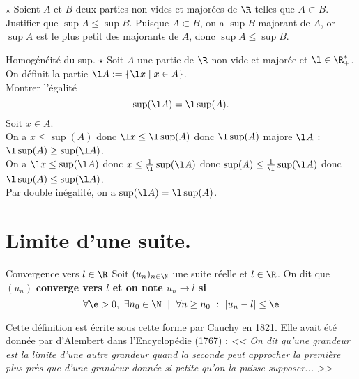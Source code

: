 \documentclass[11pt]{article}
\begin{document}
\begin{ex}{$\star$}{}
    Soient $A$ et $B$ deux parties non-vides et majorées de $\R$ telles que $A\subset B$.\\
    Justifier que $\sup A \leq \sup B$.
    \tcblower
    Puisque $A\subset B$, on a $\sup B$ majorant de $A$, or $\sup A$ est le plus petit des majorants de $A$, donc $\sup A \leq \sup B$. 
\end{ex}

\begin{ex}{Homogénéité du sup. $\star$}{}
    Soit $A$ une partie de $\R$ non vide et majorée et $\l\in\R_+^*$. On définit la partie $\l A := \{\l x \mid x \in A\}$.\\
    Montrer l'égalité
    \begin{equation*}
        \sup(\l A) = \l\sup(A).
    \end{equation*}
    \tcblower
    Soit $x\in A$.\\
    \boxed{\leq} On a $x\leq\sup(A)$ donc $\l x \leq \l \sup(A)$ donc $\l\sup(A)$ majore $\l A$ : $\l\sup(A)\geq\sup(\l A)$.\\[0.1cm]
    \boxed{\geq} On a $\l x \leq \sup(\l A)$ donc $x\leq \frac{1}{\l}\sup(\l A)$ donc $\sup(A)\leq \frac{1}{\l}\sup(\l A)$ donc $\l\sup(A)\leq\sup(\l A)$.\\[0.1cm]
    Par double inégalité, on a $\sup(\l A) = \l\sup(A)$. 
\end{ex}

\section{Limite d'une suite.}

\begin{defi}{Convergence vers $l\in\R$}{}
    Soit $(u_n)_{n\in\N}$ une suite réelle et $l\in\R$. On dit que $(u_n)$ \bf{converge} vers $l$ et on note $u_n\to l$ si
    \begin{equation*}
        \forall \e > 0, ~ \exists n_0 \in \N ~ \mid ~ \forall n \geq n_0 ~ : ~ |u_n - l| \leq \e
    \end{equation*}
\end{defi}

\quad Cette définition est écrite sous cette forme par Cauchy en 1821. Elle avait été donnée par d'Alembert dans l'Encyclopédie (1767) : \emph{<< On dit qu'une grandeur est la limite d'une autre grandeur quand la seconde peut approcher la première plus près que d'une grandeur donnée si petite qu'on la puisse supposer... >>}
\end{document}
